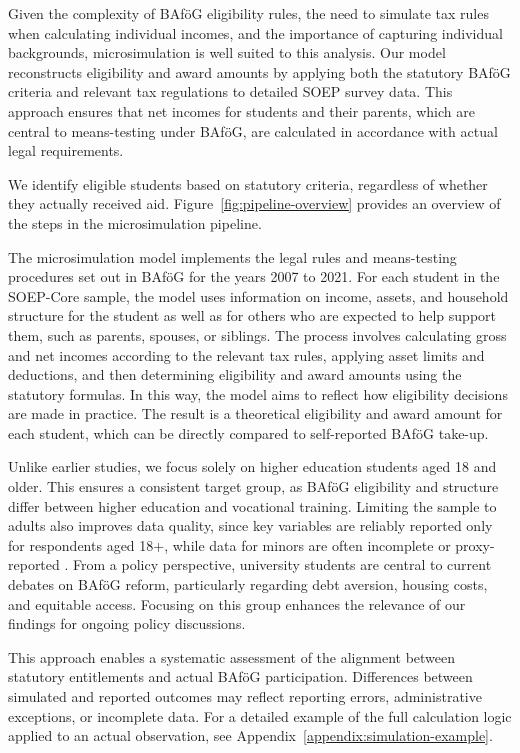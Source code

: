 Given the complexity of BAföG eligibility rules, the need to simulate tax rules when calculating individual incomes, and the importance of capturing individual backgrounds, microsimulation is well suited to this analysis. Our model reconstructs eligibility and award amounts by applying both the statutory BAföG criteria and relevant tax regulations to detailed SOEP survey data. This approach ensures that net incomes for students and their parents, which are central to means-testing under BAföG, are calculated in accordance with actual legal requirements.

We identify eligible students based on statutory criteria, regardless of whether they actually received aid. Figure~\ref{fig:pipeline-overview} provides an overview of the steps in the microsimulation pipeline.



The microsimulation model implements the legal rules and means-testing procedures set out in BAföG \citep{bafoeg_law} for the years 2007 to 2021. For each student in the SOEP-Core sample, the model uses information on income, assets, and household structure for the student as well as for others who are expected to help support them, such as parents, spouses, or siblings. The process involves calculating gross and net incomes according to the relevant tax rules, applying asset limits and deductions, and then determining eligibility and award amounts using the statutory formulas. In this way, the model aims to reflect how eligibility decisions are made in practice. The result is a theoretical eligibility and award amount for each student, which can be directly compared to self-reported BAföG take-up.

Unlike earlier studies, we focus solely on higher education students aged 18 and older. This ensures a consistent target group, as BAföG eligibility and structure differ between higher education and vocational training. 
Limiting the sample to adults also improves data quality, since key variables are reliably reported only for respondents aged 18+, while data for minors are often incomplete or proxy-reported \citep{soep_pgen_2025, soep_dtc_2005}. From a policy perspective, university students are central to current debates on BAföG reform, particularly regarding debt aversion, housing costs, and equitable access. Focusing on this group enhances the relevance of our findings for ongoing policy discussions.

This approach enables a systematic assessment of the alignment between statutory entitlements and actual BAföG participation. 
Differences between simulated and reported outcomes may reflect reporting errors, administrative exceptions, or incomplete data. 
For a detailed example of the full calculation logic applied to an actual observation, see Appendix~\ref{appendix:simulation-example}.

